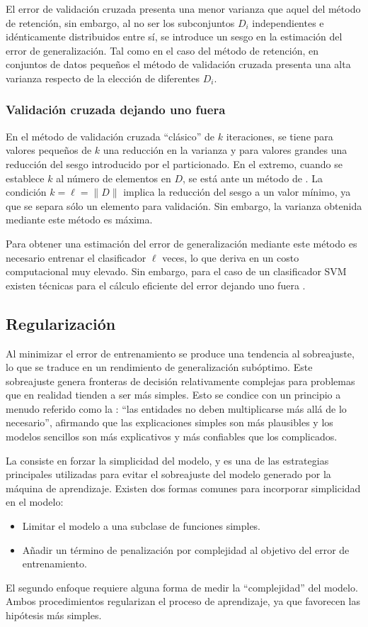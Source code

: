 El error de validación cruzada presenta una menor varianza que aquel
del método de retención, sin embargo, al no ser los subconjuntos $D_i$
independientes e idénticamente distribuidos entre sí, se introduce un
sesgo en la estimación del error de generalización.  Tal como en el
caso del método de retención, en conjuntos de datos pequeños el método
de validación cruzada presenta una alta varianza respecto de la
elección de diferentes $D_i$.
%
\subsubsection{Validación cruzada dejando uno fuera}
%
En el método de validación cruzada ``clásico'' de $k$ iteraciones, se
tiene para valores pequeños de $k$ una reducción en la varianza y para
valores grandes una reducción del sesgo introducido por el particionado.
En el extremo, cuando se
establece $k$ al número de elementos en $D$, se está ante un método de
. La condición $k=\ell=\|D\|$
implica la reducción del sesgo a un valor mínimo, ya que se separa
sólo un elemento para validación. Sin embargo, la varianza obtenida
mediante este método es máxima.

Para obtener una estimación del error de generalización mediante este
método es necesario entrenar el clasificador $\ell$ veces, lo que deriva
en un costo computacional muy elevado. Sin embargo, para el caso de un
clasificador SVM existen técnicas para el cálculo eficiente del error
dejando uno fuera \cite{chapelle, lee-keerthi}.
%
%
\subsection{Regularización}
%
Al minimizar el error de entrenamiento se produce una tendencia al
sobreajuste, lo que se traduce en un rendimiento de generalización
subóptimo. Este sobreajuste genera fronteras de decisión relativamente
complejas para problemas que en realidad tienden a ser más simples.
Esto se condice con un principio a menudo referido como la :
``las entidades no deben multiplicarse más allá de lo necesario'',
afirmando que las explicaciones simples son más plausibles y los
modelos sencillos son más explicativos y más confiables que los
complicados.

La  consiste en forzar la simplicidad del modelo, y es
una de las estrategias principales utilizadas para evitar el
sobreajuste del modelo generado por la máquina de aprendizaje. Existen
dos formas comunes para incorporar simplicidad en el modelo:
%
\begin{itemize}
\item Limitar el modelo a una subclase de funciones simples.
\item Añadir un término de penalización por complejidad al objetivo
  del error de entrenamiento.
\end{itemize}
%
El segundo enfoque requiere alguna forma de medir la ``complejidad'' del
modelo. Ambos procedimientos regularizan el proceso de aprendizaje, ya
que favorecen las hipótesis más simples.

